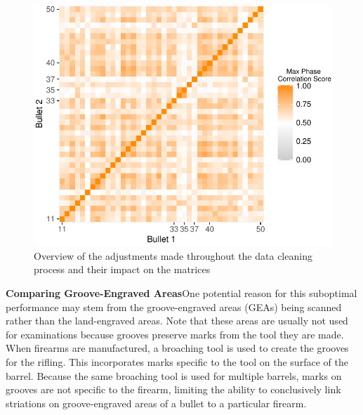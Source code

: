\documentclass[
  number,
  preprint,
  5p,
  twocolumn]{elsarticle}
\begin{document}
\begin{figure}
\begin{minipage}{0.23\linewidth}
{\includegraphics{Blinded-Interactive-Visualization-Framework-for-Forensic-Bullet-Comparisons_files/figure-pdf/fig-matrixD-4.pdf}

}


\end{minipage}%

\caption{\label{fig-matrixD}Overview of the adjustments made throughout
the data cleaning process and their impact on the matrices}

\end{figure}%

\vspace{-10pt}

\hfill\newline\noindent \textbf{Comparing Groove-Engraved
Areas}\hfill\newline One potential reason for this suboptimal
performance may stem from the groove-engraved areas (GEAs) being scanned
rather than the land-engraved areas. Note that these areas are usually
not used for examinations because grooves preserve marks from the tool
they are made. When firearms are manufactured, a broaching tool is used
to create the grooves for the rifling. This incorporates marks specific
to the tool on the surface of the barrel. Because the same broaching
tool is used for multiple barrels, marks on grooves are not specific to
the firearm, limiting the ability to conclusively link striations on
groove-engraved areas of a bullet to a particular firearm.
\end{document}
